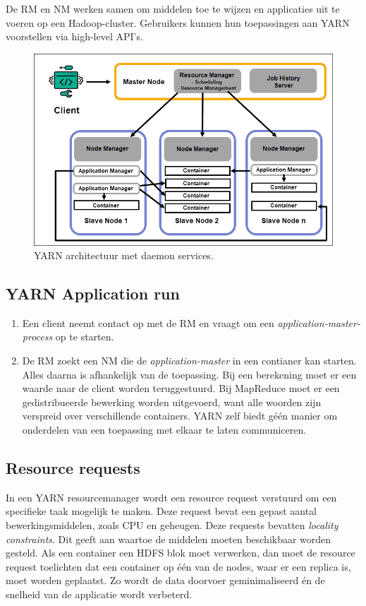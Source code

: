 \documentclass[a4paper,10pt,twoside]{report}
\begin{document}
De RM en NM werken samen om middelen toe te wijzen en applicaties uit te voeren op een Hadoop-cluster. Gebruikers kunnen hun toepassingen aan YARN voorstellen via high-level API's.

\begin{figure}
	\includegraphics[width=\linewidth]{images/yarn-daemons-hadoop-architecture.png}
	\caption{YARN architectuur met daemon services.}
\end{figure}

\subsection{YARN Application run}

\begin{enumerate}
	\item Een client neemt contact op met de RM en vraagt om een \textit{application-master-process} op te starten.
	\item De RM zoekt een NM die de \textit{application-master} in een contianer kan starten. Alles daarna is afhankelijk van de toepassing. Bij een berekening moet er een waarde naar de client worden teruggestuurd. Bij MapReduce moet er een gedistribueerde bewerking worden uitgevoerd, want alle woorden zijn verspreid over verschillende containers. YARN zelf biedt géén manier om onderdelen van een toepassing met elkaar te laten communiceren.
\end{enumerate}

\subsection{Resource requests}

In een YARN resourcemanager wordt een resource request verstuurd om een specifieke taak mogelijk te maken. Deze request bevat een gepast aantal bewerkingsmiddelen, zoals CPU en geheugen. Deze requests bevatten \textit{locality constraints}. Dit geeft aan waartoe de middelen moeten beschikbaar worden gesteld. Als een container een HDFS blok moet verwerken, dan moet de resource request toelichten dat een container op één van de nodes, waar er een replica is, moet worden geplaatst. Zo wordt de data doorvoer geminimaliseerd én de snelheid van de applicatie wordt verbeterd.
\end{document}
